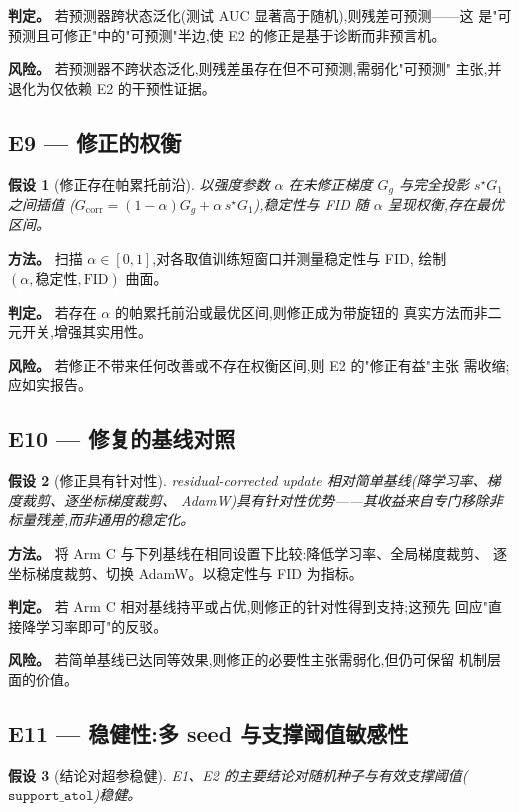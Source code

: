 \documentclass[UTF8,11pt,a4paper]{ctexart}
\newtheorem{hypothesis}{假设}[section]
\begin{document}
\textbf{判定。} 若预测器跨状态泛化(测试 AUC 显著高于随机),则残差可预测——这
是"可预测且可修正"中的"可预测"半边,使 E2 的修正是基于诊断而非预言机。

\textbf{风险。} 若预测器不跨状态泛化,则残差虽存在但不可预测,需弱化"可预测"
主张,并退化为仅依赖 E2 的干预性证据。

\subsection{E9 --- 修正的权衡}
\begin{hypothesis}[修正存在帕累托前沿]
\label{hyp:E9}
以强度参数 $\alpha$ 在未修正梯度 $G_g$ 与完全投影 $s^\star G_1$ 之间插值
($G_{\mathrm{corr}}=(1-\alpha)G_g+\alpha\,s^\star G_1$),稳定性与 FID 随
$\alpha$ 呈现权衡,存在最优区间。
\end{hypothesis}

\textbf{方法。} 扫描 $\alpha\in[0,1]$,对各取值训练短窗口并测量稳定性与 FID,
绘制 $(\alpha,\text{稳定性},\text{FID})$ 曲面。

\textbf{判定。} 若存在 $\alpha$ 的帕累托前沿或最优区间,则修正成为带旋钮的
真实方法而非二元开关,增强其实用性。

\textbf{风险。} 若修正不带来任何改善或不存在权衡区间,则 E2 的"修正有益"主张
需收缩;应如实报告。

\subsection{E10 --- 修复的基线对照}
\begin{hypothesis}[修正具有针对性]
\label{hyp:E10}
residual-corrected update 相对简单基线(降学习率、梯度裁剪、逐坐标梯度裁剪、
AdamW)具有针对性优势——其收益来自专门移除非标量残差,而非通用的稳定化。
\end{hypothesis}

\textbf{方法。} 将 Arm C 与下列基线在相同设置下比较:降低学习率、全局梯度裁剪、
逐坐标梯度裁剪、切换 AdamW。以稳定性与 FID 为指标。

\textbf{判定。} 若 Arm C 相对基线持平或占优,则修正的针对性得到支持;这预先
回应"直接降学习率即可"的反驳。

\textbf{风险。} 若简单基线已达同等效果,则修正的必要性主张需弱化,但仍可保留
机制层面的价值。

\subsection{E11 --- 稳健性:多 seed 与支撑阈值敏感性}
\begin{hypothesis}[结论对超参稳健]
\label{hyp:E11}
E1、E2 的主要结论对随机种子与有效支撑阈值($\texttt{support\_atol}$)稳健。
\end{hypothesis}
\end{document}
